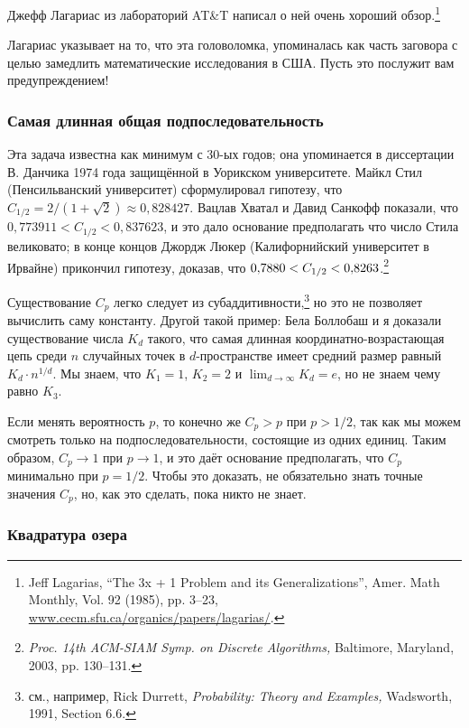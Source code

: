 Джефф Лагариас из лабораторий AT\&T написал о ней очень хороший обзор.\footnote{Jeff Lagarias, ``The 3x + 1 Problem and its Generalizations'', Amer. Math Monthly, Vol. 92 (1985), pp. 3--23, \href{http://www.cecm.sfu.ca/organics/papers/lagarias/}{www.cecm.sfu.ca/organics/papers/lagarias/}.}

Лагариас указывает на то, что эта головоломка, упоминалась как часть заговора с целью замедлить математические исследования в США.
Пусть это послужит вам предупреждением!

\subsubsection*{Самая длинная общая подпоследовательность}

Эта задача известна как минимум с 30-ых годов; она упоминается в диссертации В. Данчика 1974 года защищённой в Уорикском университете.
Майкл Стил (Пенсильванский университет) сформулировал гипотезу, что $C_{1/2} = 2/(1+\sqrt{2})\approx 0{,}828427$.
Вацлав Хватал и Давид Санкофф показали, что $0{,}773911 < C_{1/2} < 0{,}837623$, и это дало основание предполагать что число Стила великовато;
в конце концов Джордж Люкер (Калифорнийский университет в Ирвайне) прикончил гипотезу, доказав, что $0{,}7880 \z< C_{1/2} \z< 0{,}8263$.\footnote{\textit{Proc. 14th ACM-SIAM Symp. on Discrete Algorithms,} Baltimore, Maryland, 2003, pp. 130--131.}

Существование $C_p$ легко следует из субаддитивности,\footnote{см., например, Rick Durrett, \textit{Probability: Theory and Examples,} Wadsworth, 1991, Section 6.6.} но это не позволяет вычислить саму константу.
Другой такой пример: Бела Боллобаш и я доказали существование числа $K_d$ такого, что самая длинная координатно-возрастающая цепь среди $n$ случайных точек в $d$-пространстве имеет средний размер равный $K_d\cdot n^{1/d}$.
Мы знаем, что $K_1=1$, $K_2=2$ и $\lim_{d\to\infty} K_d=e$, но не знаем чему равно $K_3$.

Если менять вероятность $p$, то конечно же $C_p>p$ при $p > 1/2$, так как мы можем смотреть только на подпоследовательности, состоящие из одних единиц.
Таким образом, $C_p\to 1$ при $p\to 1$, и это даёт основание предполагать, что $C_p$ минимально при $p=1/2$.
Чтобы это доказать, не обязательно знать точные значения $C_p$,
но, как это сделать, пока никто не знает.

\subsubsection*{Квадратура озера}

